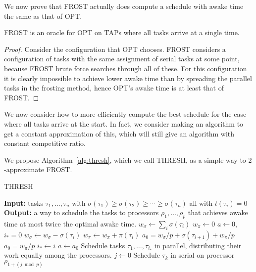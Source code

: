 We now prove that FROST actually does compute a schedule with
awake time the same as that of OPT.
\begin{lemma}
  \label{lem:frosting} 
  FROST is an oracle for OPT on TAPs where all tasks arrive at a single time.
\end{lemma}
\begin{proof}
  Consider the configuration that OPT chooses. FROST considers
  a configuration of tasks with the same assignment of serial
  tasks at some point, because FROST brute force searches
  through all of these. For this configuration it is clearly
  impossible to achieve lower awake time than by spreading the
  parallel tasks in the frosting method, hence OPT's awake time
  is at least that of FROST.
\end{proof}

We now consider how to
more efficiently compute the best schedule for the case where all
tasks arrive at the start. In fact, we consider making an
algorithm to get a constant approximation of this, which will
still give an algorithm with constant competitive ratio.

We propose Algorithm~\ref{alg:thresh}, which we call THRESH, as a
simple way to $2$-approximate FROST.

\begin{algorithm}
  \caption{THRESH}
  \label{alg:thresh}
  \begin{algorithmic}
    \State \textbf{Input:} tasks $\tau_1,\ldots, \tau_n$ with
    $\sigma(\tau_1) \ge \sigma(\tau_2)\ge \cdots \ge
    \sigma(\tau_n)$ all with $t(\tau_i) = 0$
    \State \textbf{Output:} a way to schedule the tasks to
    processors $\rho_1, \ldots, \rho_p$ that achieves awake time
    at most twice the optimal awake time.
    \State
    \State $w_\sigma \gets \sum_i \sigma(\tau_i)$
    \State $w_\pi \gets 0$
    \State $a \gets 0$, $i_* = 0$
      \State $w_\sigma \gets w_\sigma - \sigma(\tau_i)$
      \State $w_\pi \gets w_\pi + \pi(\tau_i)$
        \State $a_0 = w_\sigma / p + \sigma(\tau_{i+1}) + w_\pi/p$
      \Else
        \State $a_0 = w_\pi/p$
      \EndIf
        \State $i_* \gets i$
        \State $a \gets a_0$
      \EndIf
    \EndFor
    \State Schedule tasks $\tau_1, \ldots, \tau_{i_*}$ in
    parallel, distributing their work equally among the
    processors.
    \State $j \gets 0$
    \State Schedule $\tau_{k}$ in serial on processor $\rho_{1+(j \bmod p)}$
    \EndFor
  \end{algorithmic}
\end{algorithm}

